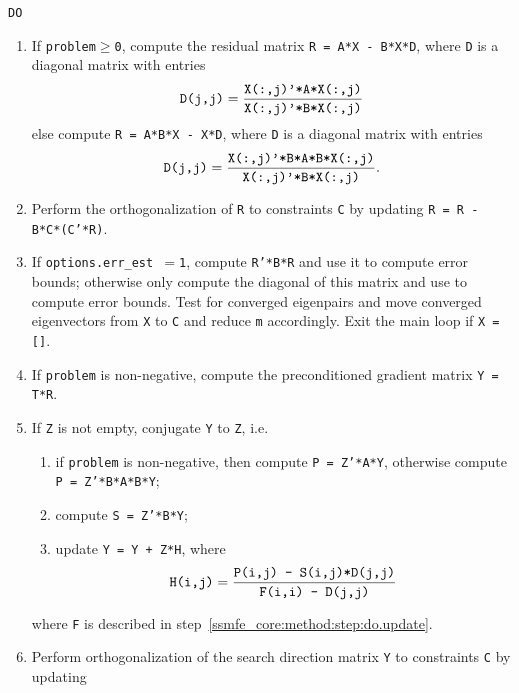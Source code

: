\begin{itemize}
{\tt DO}
\begin{enumerate}
%
\item
\label{ssmfe_core:method:step:do.R}
If {\tt problem$\ge$0}, compute the residual matrix
{\tt R = A*X - B*X*D},
where {\tt D} is a  diagonal matrix with entries
%
\begin{equation}
\label{ssmfe_core:eqn:rq}
\mbox{\tt D(j,j)}=
\frac{\mbox{\tt X(:,j)'*A*X(:,j)}}
{\mbox{\tt X(:,j)'*B*X(:,j)}}
\end{equation}
%
else compute {\tt R = A*B*X - X*D},
where {\tt D} is a diagonal matrix with entries
%
\begin{equation}
\label{ssmfe_core:eqn:rq.AB}
\mbox{\tt D(j,j)}=
\frac{\mbox{\tt X(:,j)'*B*A*B*X(:,j)}}
{\mbox{\tt X(:,j)'*B*X(:,j)}}.
\end{equation}
%
\item
\label{ssmfe_core:method:step:do.ortho.R}
Perform the orthogonalization of {\tt R} 
to constraints {\tt C} by updating
{\tt R = R - B*C*(C'*R)}.
%
\item
\label{ssmfe_core:method:step:do.save}
If {\tt options.err\_est $= $1},  compute {\tt R'*B*R}
and use it to compute error bounds;
otherwise only compute the diagonal of this matrix
and use to compute error bounds.
Test for converged eigenpairs
and move converged eigenvectors from {\tt X} to {\tt C}
and reduce {\tt m} accordingly.
Exit the main loop if {\tt X = []}.
%
\item
If {\tt problem} is non-negative,
compute the preconditioned gradient
matrix {\tt Y = T*R}.
%
\item
\label{ssmfe_core:method:step:do.JC}
If {\tt Z} is not empty, conjugate {\tt Y} to {\tt Z}, i.e.
%
\begin{enumerate}
\item 
if {\tt problem} is non-negative,
then compute {\tt P = Z'*A*Y}, 
otherwise compute {\tt P = Z'*B*A*B*Y};
\item
compute {\tt S = Z'*B*Y};
\item
update {\tt Y = Y + Z*H},
where
\begin{equation}
\label{ssmfe_core:eqn:JC}
\mbox{\tt H(i,j)}=
\frac{\mbox{\tt P(i,j) - S(i,j)*D(j,j)}}
{\mbox{\tt F(i,i) - D(j,j)}}
\end{equation}
\end{enumerate}
where {\tt F} is described in step~\ref{ssmfe_core:method:step:do.update}.
%
\item
\label{ssmfe_core:method:step:do.ortho.Y}
Perform orthogonalization of the search direction matrix {\tt Y} 
to constraints {\tt C} by updating\\

\end{enumerate}
\end{itemize}
